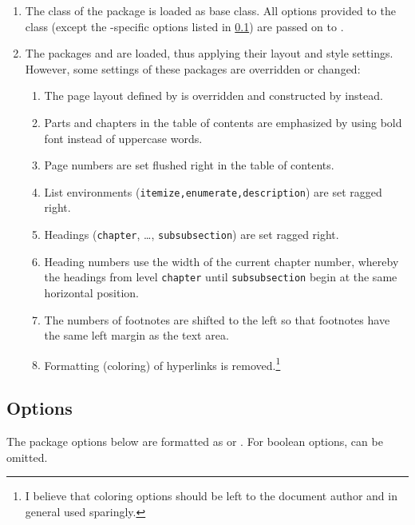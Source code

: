 \begin{enumerate}
	\item The  class of the  package is loaded as base class. All options provided to the class (except the -specific options listed in \cref{sec:options}) are passed on to .
   \item The packages  and  are loaded, thus applying their layout and style settings. However, some settings of these packages are overridden or changed:
   \begin{enumerate}
      \item The page layout defined by  is overridden and constructed by  instead.
      \item Parts and chapters in the table of contents are emphasized by using bold font instead of uppercase words.
      \item Page numbers are set flushed right in the table of contents.
      \item List environments (\lstinline|itemize,enumerate,description|) are set ragged right.
      \item Headings (\lstinline|chapter|, \dots, \lstinline|subsubsection|) are set ragged right.
      \item Heading numbers use the width of the current chapter number, whereby the headings from level \lstinline|chapter| until \lstinline|subsubsection| begin at the same horizontal position.
      \item The numbers of footnotes are shifted to the left so that footnotes have the same left margin as the text area.
      \item Formatting (coloring) of hyperlinks is removed.\footnote{I believe that coloring options should be left to the document author and in general used sparingly.}
   \end{enumerate}
\end{enumerate}

\subsection{Options}
\label{sec:options}

The package options below are formatted as  or . For boolean options,  can be omitted.

